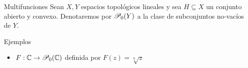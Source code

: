 \begin{frame}{Multifunciones}
  Sean $X, Y$ espacios topológicos lineales y sea 
  $H\subseteq X$ un conjunto abierto y convexo. Denotaremos 
  por $\P_0(Y)$ a la clase de subconjuntos no-vacíos 
  de $Y$.
  \begin{exampleblock}{Ejemplos}
    \begin{itemize}
      \item $F: \C\to \P_0(\C)$ definida por $F(z) = \sqrt[n]{z}$
    \end{itemize}
  \end{exampleblock}
    
\end{frame}
